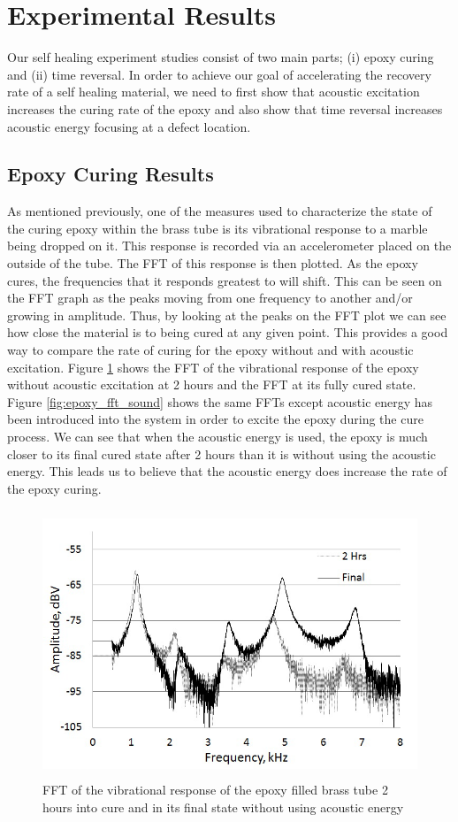 \documentclass[]{aiaa-tc}%
\begin{document}
\section{Experimental Results}
Our self healing experiment studies consist of two main parts; (i) epoxy curing and (ii) time reversal. In order to achieve our goal of accelerating the recovery rate of a self healing material, we need to first show that acoustic excitation increases the curing rate of the epoxy and also show that time reversal increases acoustic energy focusing at a defect location. 

\subsection{Epoxy Curing Results}

As mentioned previously, one of the measures used to characterize the state of the curing epoxy within the brass tube is its vibrational response to a marble being dropped on it. This response is recorded via an accelerometer placed on the outside of the tube. The FFT of this response is then plotted. As the epoxy cures, the frequencies that it responds greatest to will shift. This can be seen on the FFT graph as the peaks moving from one frequency to another and/or growing in amplitude. Thus, by looking at the peaks on the FFT plot we can see how close the material is to being cured at any given point. This provides a good way to compare the rate of curing for the epoxy without and with acoustic excitation. Figure \ref{fig:epoxy_fft_no_sound} shows the FFT of the vibrational response of the epoxy without acoustic excitation at 2 hours and the FFT at its fully cured state. Figure \ref{fig:epoxy_fft_sound} shows the same FFTs except acoustic energy has been introduced into the system in order to excite the epoxy during the cure process. We can see that when the acoustic energy is used, the epoxy is much closer to its final cured state after 2 hours than it is without using the acoustic energy. This leads us to believe that the acoustic energy does increase the rate of the epoxy curing.

\begin{figure}[H]%
\centering
 \includegraphics[height = 8cm]{epoxy_fft_no_sound}
 \caption{FFT of the vibrational response of the epoxy filled brass tube 2 hours into cure and in its final state without using acoustic energy}
 \label{fig:epoxy_fft_no_sound}
\end{figure}
\end{document}

